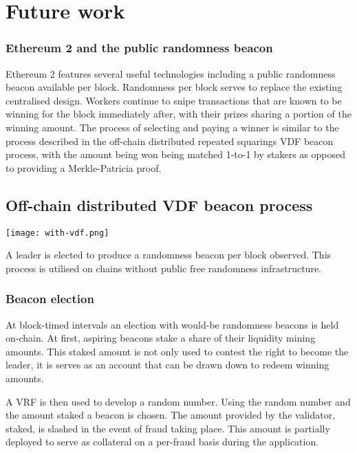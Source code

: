 
\section{Future work}

\subsubsection{Ethereum 2 and the public randomness beacon}

Ethereum 2 features several useful technologies including a public randomness beacon available per block. Randomness per block serves to replace the existing centralised design. Workers continue to snipe transactions that are known to be winning for the block immediately after, with their prizes sharing a portion of the winning amount. The process of selecting and paying a winner is similar to the process described in the off-chain distributed repeated squarings VDF beacon process, with the amount being won being matched 1-to-1 by stakers as opposed to providing a Merkle-Patricia proof.

\subsection{Off-chain distributed VDF \cite{vdf} beacon process}

\begin{center}
    \texttt{[image: with-vdf.png]}
\end{center}

A leader is elected to produce a randomness beacon per block observed. This process is utilised on chains without public free randomness infrastructure.

\subsubsection{Beacon election}

At block-timed intervals an election with would-be randomness beacons is held on-chain. At first, aspiring beacons stake a share of their liquidity mining amounts. This staked amount is not only used to contest the right to become the leader, it is serves as an account that can be drawn down to redeem winning amounts.

A VRF is then used to develop a random number. Using the random number and the amount staked a beacon is chosen. The amount provided by the validator, staked, is slashed in the event of fraud taking place. This amount is partially deployed to serve as collateral on a per-fraud basis during the application.

